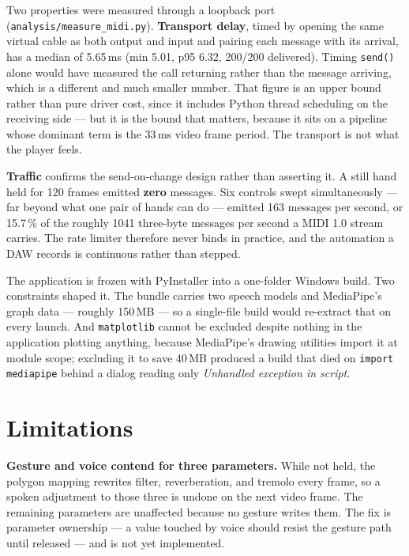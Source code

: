 \documentclass[a4paper,11pt]{article}
\newcommand{\code}[1]{\texttt{\small #1}}
\begin{document}
Two properties were measured through a loopback port
(\code{analysis/measure\_midi.py}). \textbf{Transport delay}, timed by opening
the same virtual cable as both output and input and pairing each message with
its arrival, has a median of 5.65\,ms (min 5.01, p95 6.32, 200/200 delivered).
Timing \code{send()} alone would have measured the call returning rather than
the message arriving, which is a different and much smaller number. That figure
is an upper bound rather than pure driver cost, since it includes Python thread
scheduling on the receiving side --- but it is the bound that matters, because
it sits on a pipeline whose dominant term is the 33\,ms video frame period. The
transport is not what the player feels.

\textbf{Traffic} confirms the send-on-change design rather than asserting it. A
still hand held for 120 frames emitted \textbf{zero} messages. Six controls
swept simultaneously --- far beyond what one pair of hands can do --- emitted
163 messages per second, or 15.7\,\% of the roughly 1041 three-byte messages
per second a MIDI 1.0 stream carries. The rate limiter therefore never binds in
practice, and the automation a DAW records is continuous rather than stepped.

The application is frozen with PyInstaller into a one-folder Windows build.
Two constraints shaped it. The bundle carries two speech models and MediaPipe's
graph data --- roughly 150\,MB --- so a single-file build would re-extract that
on every launch. And \code{matplotlib} cannot be excluded despite nothing in the
application plotting anything, because MediaPipe's drawing utilities import it
at module scope; excluding it to save 40\,MB produced a build that died on
\code{import mediapipe} behind a dialog reading only \emph{Unhandled exception
in script}.

\section{Limitations}

\textbf{Gesture and voice contend for three parameters.} While not held, the
polygon mapping rewrites filter, reverberation, and tremolo every frame, so a
spoken adjustment to those three is undone on the next video frame. The
remaining parameters are unaffected because no gesture writes them. The fix is
parameter ownership --- a value touched by voice should resist the gesture path
until released --- and is not yet implemented.
\end{document}
